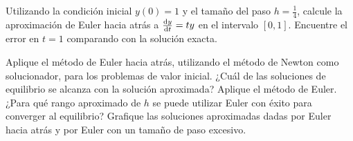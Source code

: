 \begin{questions}
    \question

    Utilizando la condición inicial $y\left(0\right)=1$ y el tamaño
    del paso $h=\frac{1}{4}$, calcule la aproximación de Euler hacia
    atrás a $\diff{y}{t}=ty$ en el intervalo $\left[0,1\right]$.
    Encuentre el error en $t=1$ comparando con la solución exacta.

    \question

    Aplique el método de Euler hacia atrás, utilizando el método de
    Newton como solucionador, para los problemas de valor inicial.
    ¿Cuál de las soluciones de equilibrio se alcanza con la solución
    aproximada?
    Aplique el método de Euler.
    ¿Para qué rango aproximado de $h$ se puede utilizar Euler con
    éxito para converger al equilibrio?
    Grafique las soluciones aproximadas dadas por Euler hacia atrás y
    por Euler con un tamaño de paso excesivo.

    \begin{multicols}{2}

    \end{multicols}
\end{questions}

